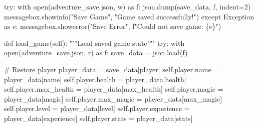 \documentclass[
  letterpaper,
  DIV=11,
  numbers=noendperiod,
  oneside]{scrreprt}
\newenvironment{Shaded}{}{}
\newcommand{\BuiltInTok}[1]{\textcolor[rgb]{0.84,0.23,0.29}{#1}}
\newcommand{\CommentTok}[1]{\textcolor[rgb]{0.42,0.45,0.49}{#1}}
\newcommand{\ControlFlowTok}[1]{\textcolor[rgb]{0.84,0.23,0.29}{#1}}
\newcommand{\DecValTok}[1]{\textcolor[rgb]{0.00,0.36,0.77}{#1}}
\newcommand{\ImportTok}[1]{\textcolor[rgb]{0.01,0.18,0.38}{#1}}
\newcommand{\KeywordTok}[1]{\textcolor[rgb]{0.84,0.23,0.29}{#1}}
\newcommand{\NormalTok}[1]{\textcolor[rgb]{0.14,0.16,0.18}{#1}}
\newcommand{\OperatorTok}[1]{\textcolor[rgb]{0.14,0.16,0.18}{#1}}
\newcommand{\PreprocessorTok}[1]{\textcolor[rgb]{0.84,0.23,0.29}{#1}}
\newcommand{\SpecialCharTok}[1]{\textcolor[rgb]{0.00,0.36,0.77}{#1}}
\newcommand{\SpecialStringTok}[1]{\textcolor[rgb]{0.01,0.18,0.38}{#1}}
\newcommand{\StringTok}[1]{\textcolor[rgb]{0.01,0.18,0.38}{#1}}
\newcommand{\VariableTok}[1]{\textcolor[rgb]{0.89,0.38,0.04}{#1}}
\begin{document}
\begin{Shaded}
\begin{Highlighting}[]
        \ControlFlowTok{try}\NormalTok{:}
            \ControlFlowTok{with} \BuiltInTok{open}\NormalTok{(}\StringTok{\textquotesingle{}adventure\_save.json\textquotesingle{}}\NormalTok{, }\StringTok{\textquotesingle{}w\textquotesingle{}}\NormalTok{) }\ImportTok{as}\NormalTok{ f:}
\NormalTok{                json.dump(save\_data, f, indent}\OperatorTok{=}\DecValTok{2}\NormalTok{)}
\NormalTok{            messagebox.showinfo(}\StringTok{"Save Game"}\NormalTok{, }\StringTok{"Game saved successfully!"}\NormalTok{)}
        \ControlFlowTok{except} \PreprocessorTok{Exception} \ImportTok{as}\NormalTok{ e:}
\NormalTok{            messagebox.showerror(}\StringTok{"Save Error"}\NormalTok{, }\SpecialStringTok{f"Could not save game: }\SpecialCharTok{\{}\NormalTok{e}\SpecialCharTok{\}}\SpecialStringTok{"}\NormalTok{)}
    
    \KeywordTok{def}\NormalTok{ load\_game(}\VariableTok{self}\NormalTok{):}
        \CommentTok{"""Load saved game state"""}
        \ControlFlowTok{try}\NormalTok{:}
            \ControlFlowTok{with} \BuiltInTok{open}\NormalTok{(}\StringTok{\textquotesingle{}adventure\_save.json\textquotesingle{}}\NormalTok{, }\StringTok{\textquotesingle{}r\textquotesingle{}}\NormalTok{) }\ImportTok{as}\NormalTok{ f:}
\NormalTok{                save\_data }\OperatorTok{=}\NormalTok{ json.load(f)}
            
            \CommentTok{\# Restore player}
\NormalTok{            player\_data }\OperatorTok{=}\NormalTok{ save\_data[}\StringTok{\textquotesingle{}player\textquotesingle{}}\NormalTok{]}
            \VariableTok{self}\NormalTok{.player.name }\OperatorTok{=}\NormalTok{ player\_data[}\StringTok{\textquotesingle{}name\textquotesingle{}}\NormalTok{]}
            \VariableTok{self}\NormalTok{.player.health }\OperatorTok{=}\NormalTok{ player\_data[}\StringTok{\textquotesingle{}health\textquotesingle{}}\NormalTok{]}
            \VariableTok{self}\NormalTok{.player.max\_health }\OperatorTok{=}\NormalTok{ player\_data[}\StringTok{\textquotesingle{}max\_health\textquotesingle{}}\NormalTok{]}
            \VariableTok{self}\NormalTok{.player.magic }\OperatorTok{=}\NormalTok{ player\_data[}\StringTok{\textquotesingle{}magic\textquotesingle{}}\NormalTok{]}
            \VariableTok{self}\NormalTok{.player.max\_magic }\OperatorTok{=}\NormalTok{ player\_data[}\StringTok{\textquotesingle{}max\_magic\textquotesingle{}}\NormalTok{]}
            \VariableTok{self}\NormalTok{.player.level }\OperatorTok{=}\NormalTok{ player\_data[}\StringTok{\textquotesingle{}level\textquotesingle{}}\NormalTok{]}
            \VariableTok{self}\NormalTok{.player.experience }\OperatorTok{=}\NormalTok{ player\_data[}\StringTok{\textquotesingle{}experience\textquotesingle{}}\NormalTok{]}
            \VariableTok{self}\NormalTok{.player.stats }\OperatorTok{=}\NormalTok{ player\_data[}\StringTok{\textquotesingle{}stats\textquotesingle{}}\NormalTok{]}
            

\end{Highlighting}
\end{Shaded}
\end{document}
